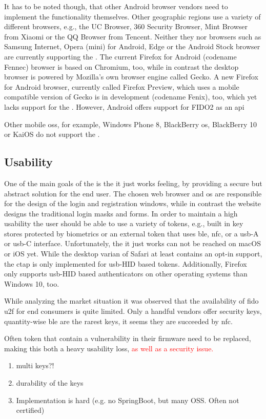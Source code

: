 It has to be noted though, that other Android browser vendors need to implement the functionality themselves. Other geographic regions use a variety of different browsers, e.g., the UC Browser, 360 Security Browser, Mint Browser from Xiaomi or the QQ Browser from Tencent. Neither they nor browsers such as Samsung Internet, Opera (mini) for Android, Edge or the Android Stock browser are currently supporting the \wa. The current Firefox for Android (codename \frqq Fennec\flqq) browser is based on Chromium, too, while in contrast the desktop browser is powered by Mozilla's own browser engine called \frqq Gecko\flqq. A new Firefox for Android browser, currently called Firefox Preview, which uses a mobile compatible version of Gecko is in development (codename \frqq Fenix\flqq), too, which yet lacks support for the \wa. However, Android offers support for FIDO2 as an \gls{api}

Other mobile \glspl{os}, for example, Windows Phone 8, BlackBerry \gls{os}, BlackBerry 10 or KaiOS do not support the \wa.

\subsection{Usability}

One of the main goals of the \wa{} is the \frqq it just works\flqq{} feeling, by providing a secure but abstract solution for the end user. The chosen web browser and \gls{os} are responsible for the design of the login and registration windows, while in contrast the website designs the traditional login masks and forms. In order to maintain a high usability the user should be able to use a variety of tokens, e.g., built in key stores protected by biometrics or an external token that uses \gls{ble}, \gls{nfc}, or a \gls{usb}-A or \gls{usb}-C interface. Unfortunately, the \frqq it just works\flqq{} can not be reached on macOS or iOS yet. While the desktop varian of Safari at least contains an opt-in support, the \gls{ctap} is only implemented for \gls{usb}-HID based tokens. Additionally, Firefox only supports \gls{usb}-HID based authenticators on other operating systems than Windows 10, too.

While analyzing the market situation it was observed that the availability of \gls{fido} \gls{u2f} for end consumers is quite limited. Only a handful vendors offer security keys, quantity-wise \gls{ble} are the rarest keys, it seems they are succeeded by \gls{nfc}.

Often token that contain a vulnerability in their firmware need to be replaced, making this both a heavy usability loss, \textcolor{red}{as well as a security issue.}

\begin{enumerate}
	\item multi keys?!
	\item durability of the keys
	\item Implementation is hard (e.g. no SpringBoot, but many OSS. Often not certified)
\end{enumerate}
